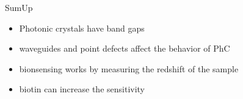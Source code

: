 \begin{frame}{SumUp}
  \begin{itemize}
    \setlength\itemsep{1.2em}
    \item{Photonic crystals have band gaps}
    \item{waveguides and point defects affect the behavior of PhC}
    \item{bionsensing works by measuring the redshift of the sample }
    \item{biotin can increase the sensitivity}
  \end{itemize}
\end{frame}

\begin{frame}
  \nocite{*}
  \printbibliography
\end{frame}

